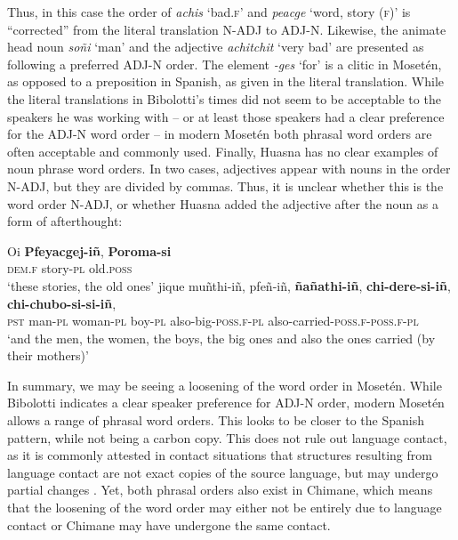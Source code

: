 \documentclass[output=paper,colorlinks,citecolor=brown
]{langscibook}
\begin{document}
Thus, in this case the order of \textit{achis} ‘bad.\textsc{f}’ and \textit{peacge} ‘word, story (\textsc{f})’ is “corrected” from the literal translation N-ADJ to ADJ-N. Likewise, the animate head noun \textit{soñi} ‘man’ and the adjective \textit{achitchit} ‘very bad’ are presented as following a preferred ADJ-N order. The element \textit{-ges} ‘for’ is a clitic in Mosetén, as opposed to a preposition in Spanish, as given in the literal translation.
While the literal translations in Bibolotti’s times did not seem to be acceptable to the speakers he was working with -- or at least those speakers had a clear preference for the ADJ-N word order -- in modern Mosetén both phrasal word orders are often acceptable and commonly used.	
Finally, Huasna has no clear examples of noun phrase word orders. In two cases, adjectives appear with nouns in the order N-ADJ, but they are divided by commas. Thus, it is unclear whether this is the word order N-ADJ, or whether Huasna added the adjective after the noun as a form of afterthought:

\ea \label{sakel_example_19}
\gll Oi 		\textbf{Pfeyacgej-iñ}, 		\textbf{Poroma-si}\\
     \textsc{\textsc{dem}}.\textsc{f}	story-\textsc{pl}		old.\textsc{poss}\\
\glt ‘these stories, the old ones’
\ex \label{sakel_example_20}
\gll jique	muñthi-iñ,	pfeñ-iñ,	\textbf{ñañathi-iñ},  \textbf{chi-dere-si-iñ},		\textbf{chi-chubo-si-si-iñ},\\
     	\textsc{pst}	man-\textsc{pl}	woman-\textsc{pl}	boy-\textsc{pl}	also-big-\textsc{poss.f-pl}	also-carried-\textsc{poss.f-poss.f-pl}\\
\glt ‘and the men, the women, the boys, the big ones and also the ones carried (by their mothers)’
\z	
	
In summary, we may be seeing a loosening of the word order in Mosetén. While Bibolotti indicates a clear speaker preference for ADJ-N order, modern Mosetén allows a range of phrasal word orders. This looks to be closer to the Spanish pattern, while not being a carbon copy. This does not rule out language contact, as it is commonly attested in contact situations that structures resulting from language contact are not exact copies of the source language, but may undergo partial changes \citep{heine2005language}. Yet, both phrasal orders also exist in Chimane, which means that the loosening of the word order may either not be entirely due to language contact or Chimane may have undergone the same contact.
\end{document}
